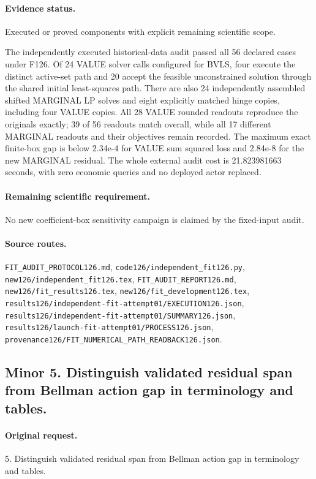 \paragraph{Evidence status.} Executed or proved components with explicit remaining scientific scope.

The independently executed historical-data audit passed all 56 declared cases under F126. Of 24 VALUE solver calls configured for BVLS, four execute the distinct active-set path and 20 accept the feasible unconstrained solution through the shared initial least-squares path. There are also 24 independently assembled shifted MARGINAL LP solves and eight explicitly matched hinge copies, including four VALUE copies. All 28 VALUE rounded readouts reproduce the originals exactly; 39 of 56 readouts match overall, while all 17 different MARGINAL readouts and their objectives remain recorded. The maximum exact finite-box gap is below 2.34e-4 for VALUE sum squared loss and 2.84e-8 for the new MARGINAL residual. The whole external audit cost is 21.823981663 seconds, with zero economic queries and no deployed actor replaced.\par

\paragraph{Remaining scientific requirement.} No new coefficient-box sensitivity campaign is claimed by the fixed-input audit.

\paragraph{Source routes.} \nolinkurl{FIT_AUDIT_PROTOCOL126.md}, \nolinkurl{code126/independent_fit126.py}, \nolinkurl{new126/independent_fit126.tex}, \nolinkurl{FIT_AUDIT_REPORT126.md}, \nolinkurl{new126/fit_results126.tex}, \nolinkurl{new126/fit_development126.tex}, \nolinkurl{results126/independent-fit-attempt01/EXECUTION126.json}, \nolinkurl{results126/independent-fit-attempt01/SUMMARY126.json}, \nolinkurl{results126/launch-fit-attempt01/PROCESS126.json}, \nolinkurl{provenance126/FIT_NUMERICAL_PATH_READBACK126.json}.

\subsection*{Minor 5. Distinguish validated residual span from Bellman action gap in terminology and tables.}
\paragraph{Original request.} 5. Distinguish validated residual span from Bellman action gap in terminology and tables.

